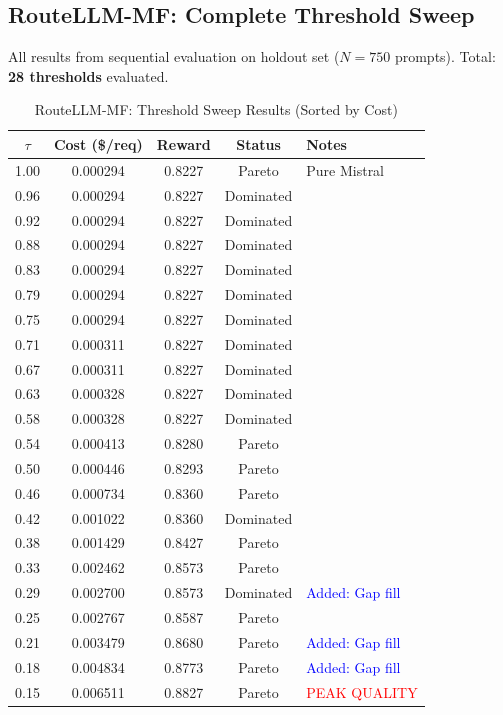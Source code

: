 \subsection*{RouteLLM-MF: Complete Threshold Sweep}

All results from sequential evaluation on holdout set ($N=750$ prompts). Total: \textbf{28 thresholds} evaluated.

\begin{table}[H]
\centering
\caption{RouteLLM-MF: Threshold Sweep Results (Sorted by Cost)}
\label{tab:routellm_complete}
\small
\begin{tabular}{ccccl}
\toprule
$\tau$ & \textbf{Cost (\$/req)} & \textbf{Reward} & \textbf{Status} & \textbf{Notes} \\
\midrule
1.00 & 0.000294 & 0.8227 & Pareto & Pure Mistral \\
0.96 & 0.000294 & 0.8227 & Dominated & \\
0.92 & 0.000294 & 0.8227 & Dominated & \\
0.88 & 0.000294 & 0.8227 & Dominated & \\
0.83 & 0.000294 & 0.8227 & Dominated & \\
0.79 & 0.000294 & 0.8227 & Dominated & \\
0.75 & 0.000294 & 0.8227 & Dominated & \\
0.71 & 0.000311 & 0.8227 & Dominated & \\
0.67 & 0.000311 & 0.8227 & Dominated & \\
0.63 & 0.000328 & 0.8227 & Dominated & \\
0.58 & 0.000328 & 0.8227 & Dominated & \\
0.54 & 0.000413 & 0.8280 & Pareto & \\
0.50 & 0.000446 & 0.8293 & Pareto & \\
0.46 & 0.000734 & 0.8360 & Pareto & \\
0.42 & 0.001022 & 0.8360 & Dominated & \\
0.38 & 0.001429 & 0.8427 & Pareto & \\
0.33 & 0.002462 & 0.8573 & Pareto & \\
0.29 & 0.002700 & 0.8573 & Dominated & \textcolor{blue}{Added: Gap fill} \\
0.25 & 0.002767 & 0.8587 & Pareto & \\
0.21 & 0.003479 & 0.8680 & Pareto & \textcolor{blue}{Added: Gap fill} \\
0.18 & 0.004834 & 0.8773 & Pareto & \textcolor{blue}{Added: Gap fill} \\
0.15 & 0.006511 & 0.8827 & Pareto & \textcolor{red}{PEAK QUALITY} \\

\end{tabular}
\end{table}
